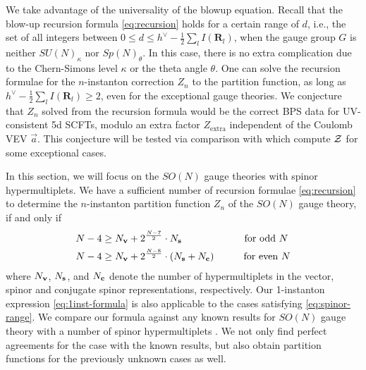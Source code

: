 \documentclass[letterpaper, 11pt]{article}
\def\CZ{{\cal Z}}
\def\k{\kappa}
\begin{document}
{We take advantage of the universality of the blowup equation. Recall that the blow-up recursion formula \eqref{eq:recursion} holds for a certain range of $d$, i.e., the set of all integers between $0 \leq d \leq h^\vee - \frac{1}{2}\sum_l I(\mathbf{R}_l)$, when the gauge group $G$ is neither $ SU(N)_\k$ nor $Sp(N)_\theta$. In this case, there is no extra complication due to the Chern-Simons level $\kappa$ or the theta angle $\theta$.
One can solve the recursion formulae for the $n$-instanton correction $Z_n$ to the partition function, as long as $h^\vee - \frac{1}{2}\sum_l I(\mathbf{R}_l) \geq 2$, even for the exceptional gauge theories. We conjecture that $Z_n$ solved from the recursion formula would be the correct BPS data for UV-consistent 5d SCFTs, modulo an extra factor $Z_\text{extra}$ independent of the Coulomb VEV $\vec{a}$. This conjecture will be tested via comparison with \cite{Kim:2018gjo, DelZotto:2018tcj,Hayashi:2019yxj} which compute $\CZ$ for some exceptional cases. 


In this section, we will focus on the $SO(N)$ gauge theories with spinor hypermultiplets.
We have a sufficient number of recursion formulae \eqref{eq:recursion} to determine the $n$-instanton partition function $Z_n$ of the $SO(N)$ gauge theory, if and only if  
\begin{align}
  \label{eq:spinor-range}
  \begin{split}
  N-4 &\geq N_{\bf v} + 2^{\frac{N-7}{2}}\cdot N_{\bf s} \qquad\qquad\qquad \text{ for odd $N$}\\
  N-4 &\geq N_{\bf v} + 2^{\frac{N-8}{2}}\cdot (N_{\bf s} + N_{\bf c})\qquad\quad \text{for even $N$}
  \end{split}
\end{align}
where $N_{\bf v}$, $N_{\bf s}$, and $N_{\bf c}$ denote the number of hypermultiplets in the vector, spinor and conjugate spinor representations, respectively. Our 1-instanton expression \eqref{eq:1inst-formula} is also applicable to the cases satisfying \eqref{eq:spinor-range}. 
We compare our formula against any known results for $SO(N)$ gauge theory with a number of spinor hypermultiplets  \cite{Kim:2018gjo, DelZotto:2018tcj}. We not only find perfect agreements for the case with the known results, but also  obtain partition functions for the previously unknown cases as well. 

}
\end{document}
